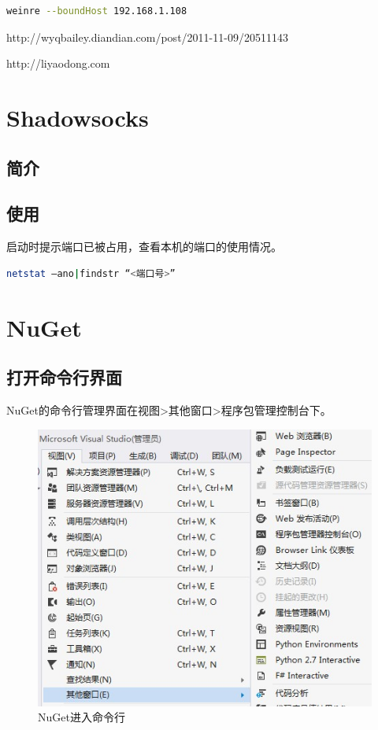 \documentclass{book}
\begin{document}
\begin{lstlisting}[language=bash]
weinre --boundHost 192.168.1.108
\end{lstlisting}

http://wyqbailey.diandian.com/post/2011-11-09/20511143


http://liyaodong.com

\section{Shadowsocks}

\subsection{简介}

\subsection{使用}

启动时提示端口已被占用，查看本机的端口的使用情况。

\begin{lstlisting}[language=bash]
netstat –ano|findstr “<端口号>”
\end{lstlisting}

\section{NuGet}

\subsection{打开命令行界面}

NuGet的命令行管理界面在视图>其他窗口>程序包管理控制台下。

\begin{figure}[htbp]
	\centering
	\includegraphics[scale=0.6]{NuGetProgramManageConsole.jpg}
	\caption{NuGet进入命令行}
	\label{fig:NuGetProgramManageConsole}
\end{figure}
\end{document}
